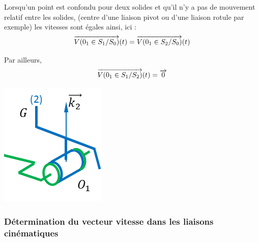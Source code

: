 \documentclass[10pt,oneside]{article}
\begin{document}
\begin{rem}
\begin{minipage}[c]{.65\linewidth}
Lorsqu'un point est confondu pour deux solides et qu'il n'y a pas de mouvement relatif entre les solides, (centre d'une liaison pivot ou d'une liaison rotule par exemple) les vitesses sont égales ainsi, ici : 
$$
\overrightarrow{V(0_1\in S_1/S_0)}(t) = \overrightarrow{V(0_1\in S_2/S_0)}(t)
$$

Par ailleurs, 
$$
\overrightarrow{V(0_1\in S_1/S_2)}(t) = \overrightarrow{0}
$$
\end{minipage}\hfill
\begin{minipage}[c]{.3\linewidth}
\begin{center}
\includegraphics[width=.8\textwidth]{png/centrifugeuse_4}
\end{center}
\end{minipage}
\end{rem}
\subsubsection{Détermination du vecteur vitesse dans les liaisons cinématiques}
\end{document}
